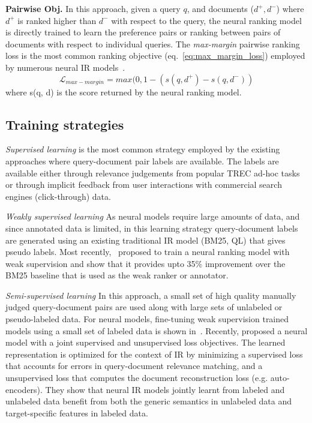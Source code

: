 \textbf{Pairwise Obj.} In this approach, given a query $q$, and documents ($d^+, d^-$) where $d^+$ is ranked higher than $d^-$ with respect to the query, the neural ranking model is directly trained to learn the preference pairs or ranking between pairs of documents with respect to individual queries. The \textit{max-margin} pairwise ranking loss is the most common ranking objective (eq.~\ref{eq:max_margin_loss}) employed by numerous neural IR models~\citep{Guo2016, KNRM17, matchpyramid16}.
\begin{equation}\label{eq:max_margin_loss}
    \mathcal{L}_{max-margin} = max(0, 1 - (s(q, d^+) - s(q,d^-))
\end{equation}
where s(q, d) is the score returned by the neural ranking model.

\subsection{Training strategies}
\textit{Supervised learning} is the most common strategy employed by the existing approaches where query-document pair labels are available. The labels are available either through relevance judgements from popular TREC ad-hoc tasks or through implicit feedback from user interactions with commercial search engines (click-through) data. 

\textit{Weakly supervised learning} As neural models require large amounts of data, and since annotated data is limited, in this learning strategy query-document labels are generated using an existing traditional IR model (BM25, QL) that gives pseudo labels. Most recently,~\cite{Dehghani_sigir17} proposed to train a neural ranking model with weak supervision and show that it provides upto 35\% improvement over the BM25 baseline that is used as the weak ranker or annotator.

\textit{Semi-supervised learning} In this approach, a small set of high quality manually judged query-document pairs are used along with large sets of unlabeled or pseudo-labeled data. For neural models, fine-tuning weak supervision trained models using a small set of labeled data is shown in~\citep{dehghani2018fidelityweighted}. Recently, \cite{Bo_coling18} proposed a neural model with a joint supervised and unsupervised loss objectives. The learned representation is optimized for the context of IR by minimizing a supervised loss that accounts for errors in query-document relevance matching, and a unsupervised loss that computes the document reconstruction loss (e.g. auto-encoders). They show that neural IR models jointly learnt from labeled and unlabeled data benefit from both the generic semantics in unlabeled data and target-specific features in labeled data.

